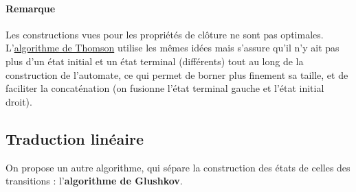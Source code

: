 \paragraph*{Remarque} Les constructions vues pour les propriétés de clôture ne sont pas optimales. L'\href{https://fr.wikipedia.org/wiki/Algorithme_de_Thompson}{algorithme de Thomson} utilise les mêmes idées mais s'assure qu'il n'y ait pas plus d'un état initial et un état terminal (différents) tout au long de la construction de l'automate, ce qui permet de borner plus finement sa taille, et de faciliter la concaténation (on fusionne l'état terminal gauche et l'état initial droit).

\subsection{Traduction linéaire}

On propose un autre algorithme, qui sépare la construction des états de celles des transitions : l'\textbf{algorithme de Glushkov}.

